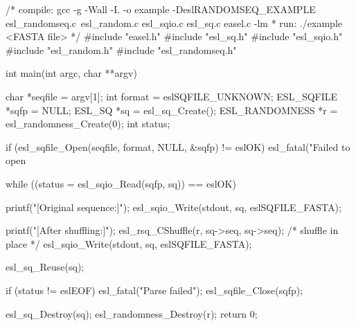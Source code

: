 \begin{cchunk}
/* compile: gcc -g -Wall -I. -o example -DeslRANDOMSEQ_EXAMPLE esl_randomseq.c\
            esl_random.c esl_sqio.c esl_sq.c easel.c -lm
 * run:     ./example <FASTA file>
 */
#include "easel.h"
#include "esl_sq.h"
#include "esl_sqio.h"
#include "esl_random.h"
#include "esl_randomseq.h"

int
main(int argc, char **argv)
{
  char           *seqfile = argv[1];
  int             format  = eslSQFILE_UNKNOWN;
  ESL_SQFILE     *sqfp    = NULL;
  ESL_SQ         *sq      = esl_sq_Create();
  ESL_RANDOMNESS *r       = esl_randomness_Create(0);
  int             status;

  if (esl_sqfile_Open(seqfile, format, NULL, &sqfp) != eslOK) 
    esl_fatal("Failed to open %

  while ((status = esl_sqio_Read(sqfp, sq)) == eslOK)
  {
    printf("[Original sequence:]\n");
    esl_sqio_Write(stdout, sq, eslSQFILE_FASTA);

    printf("[After shuffling:]\n");
    esl_rsq_CShuffle(r, sq->seq, sq->seq); /* shuffle in place */
    esl_sqio_Write(stdout, sq, eslSQFILE_FASTA);

    esl_sq_Reuse(sq);
  }
  if (status != eslEOF) esl_fatal("Parse failed");
  esl_sqfile_Close(sqfp);
  
  esl_sq_Destroy(sq);
  esl_randomness_Destroy(r);
  return 0;
}
\end{cchunk}
